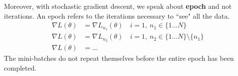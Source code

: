 \documentclass{article}
\begin{document}
\begin{itemize}
        Moreover, with stochastic gradient descent, we speak about \textbf{epoch} and not
        iterations. An epoch refers to the iterations necessary to ``see" all
        the data.
        \begin{equation*}
            \begin{aligned}
                \nabla L(\theta)&=\nabla L_{n_1}(\theta)\quad i=1,\
                n_1\in\{1\dots N\}\\
                \nabla L(\theta)&=\nabla L_{n_2}(\theta)\quad i=1,\ n_2\in\{1\dots
                N\}\setminus\{n_1\}\\
                \nabla L(\theta)&=\ldots
            \end{aligned}
        \end{equation*}
        The mini-batches do not repeat themselves before the entire epoch has
        been completed.
\end{itemize}
\cleardoublepage
\end{document}
